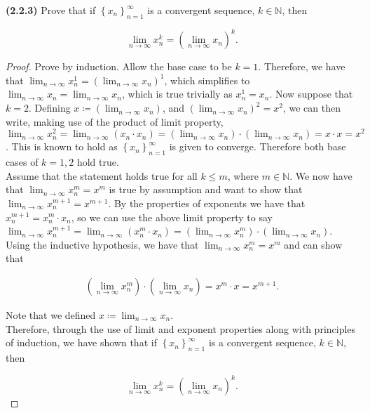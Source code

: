 \documentclass[12pt]{article}
\newcommand{\limtoinf}[1]{\lim_{ {#1} \to\infty}}
\newcommand{\seq}[2][n]{\left\{ {#2} \right\}_{#1=1}^\infty}
\newcommand{\paren}[1]{\left( {#1} \right)}
\newcommand{\bN}{\mathbb{N}}
\begin{document}
\pagestyle{fancy}
\setlength{\headheight}{14.49998pt}
\fancyfoot[C]{\thepage}

\noindent \textbf{(2.2.3)} Prove that if $\seq{x_n}$ is a convergent sequence, $k\in\bN$, then

\begin{equation*}
	\limtoinf{n} x_n^k = \paren{\limtoinf{n} x_n}^k.
\end{equation*}

\begin{proof}
	Prove by induction. Allow the base case to be $k=1$. Therefore, we have that $\limtoinf{n} x_n^1=\paren{\limtoinf{n} x_n}^1$, which simplifies to $\limtoinf{n} x_n=\limtoinf{n} x_n$, which is true trivially as $x_n^1=x_n$. Now suppose that $k=2$. Defining $x\coloneq\paren{\limtoinf{n} x_n}$, and $\paren{\limtoinf{n} x_n}^2=x^2$, we can then write, making use of the product of limit property, $\limtoinf{n} x_n^2=\limtoinf{n} (x_n\cdot x_n)=\paren{\limtoinf{n} x_n}\cdot\paren{\limtoinf{n} x_n} =x\cdot x=x^2$. This is known to hold as $\seq{x_n}$ is given to converge. Therefore both base cases of $k=1,2$ hold true. \\
\indent Assume that the statement holds true for all $k\le m$, where $m\in\bN$. We now have that $\limtoinf{n} x_n^m=x^m$ is true by assumption and want to show that $\limtoinf{n} x_n^{m+1}=x^{m+1}$. By the properties of exponents we have that $x_n^{m+1}=x_n^m\cdot x_n$, so we can use the above limit property to say $\limtoinf{n} x_n^{m+1}=\limtoinf{n} \paren{x_n^m\cdot x_n}=\paren{\limtoinf{n} x_n^m}\cdot\paren{\limtoinf{n} x_n}$. Using the inductive hypothesis, we have that $\limtoinf{n} x_n^m=x^m$ and can show that

\begin{align*}
	\paren{\limtoinf{n} x_n^m}\cdot\paren{\limtoinf{n} x_n}=x^m\cdot x=x^{m+1}.
\end{align*}

\noindent Note that we defined $x\coloneq\limtoinf{n} x_n$. \\

\indent Therefore, through the use of limit and exponent properties along with principles of induction, we have shown that if $\seq{x_n}$ is a convergent sequence, $k\in\bN$, then

\begin{equation*}
	\limtoinf{n} x_n^k = \paren{\limtoinf{n} x_n}^k.
\end{equation*}

\end{proof}
\end{document}
